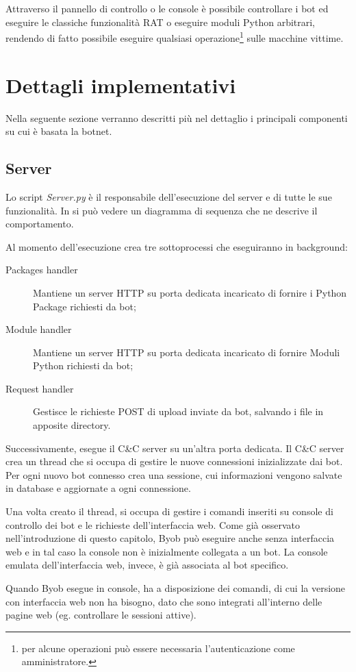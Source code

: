 Attraverso il pannello di controllo o le console è possibile controllare i bot ed eseguire le classiche funzionalità RAT o eseguire moduli Python arbitrari, rendendo di fatto possibile eseguire qualsiasi operazione\footnote{per alcune operazioni può essere necessaria l'autenticazione come amministratore.} sulle macchine vittime.


\section{Dettagli implementativi}
Nella seguente sezione verranno descritti più nel dettaglio i principali componenti su cui è basata la botnet.

\subsection{Server}
Lo script \textit{Server.py} è il responsabile dell'esecuzione del server e di tutte le sue funzionalità. In  si può vedere un diagramma di sequenza che ne descrive il comportamento.

Al momento dell'esecuzione crea tre sottoprocessi che eseguiranno in background:
\begin{description}
    \item[Packages handler] Mantiene un server HTTP su porta dedicata incaricato di fornire i Python Package richiesti da bot;
    \item[Module handler] Mantiene un server HTTP su porta dedicata incaricato di fornire Moduli Python richiesti da bot;
    \item[Request handler] Gestisce le richieste POST di upload  inviate da bot, salvando i file in apposite directory.
\end{description}
Successivamente, esegue il C\&C server su un'altra porta dedicata.
Il C\&C server crea un thread che si occupa di gestire le nuove connessioni inizializzate dai bot. Per ogni nuovo bot connesso crea una sessione, cui informazioni vengono salvate in database e aggiornate a ogni connessione. 

Una volta creato il thread, si occupa di gestire i comandi inseriti su console di controllo dei bot e le richieste  dell'interfaccia web.
Come già osservato nell'introduzione di questo capitolo, Byob può eseguire anche senza interfaccia web e in tal caso la console non è inizialmente collegata a un bot. La console emulata dell'interfaccia web, invece, è già associata al bot specifico. 

Quando Byob esegue in console, ha a disposizione dei comandi, di cui la versione con interfaccia web non ha bisogno, dato che sono integrati all'interno delle pagine web (eg. controllare le sessioni attive).

